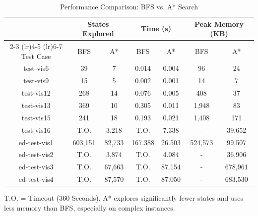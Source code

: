 \begin{table}[H]
\centering
\footnotesize
\setlength{\tabcolsep}{14pt}
\begin{threeparttable}
\caption{Performance Comparison: BFS vs. A* Search}
\label{tab:bench}
\begin{tabular}{c c c c c c c}
\toprule
 & \multicolumn{2}{c}{States Explored} & \multicolumn{2}{c}{Time (s)} & \multicolumn{2}{c}{Peak Memory (KB)} \\
\cmidrule(lr){2-3} \cmidrule(lr){4-5} \cmidrule(lr){6-7}
Test Case & BFS & A* & BFS & A* & BFS & A* \\
\midrule
test-vis6 & 39 & 7 & 0.014 & 0.004 & 96 & 24 \\
test-vis9 & 15 & 5 & 0.002 & 0.001 & 14 & 7 \\
test-vis12 & 268 & 14 & 0.076 & 0.005 & 408 & 37 \\
test-vis13 & 369 & 10 & 0.305 & 0.011 & 1,948 & 83 \\
test-vis15 & 241 & 18 & 0.193 & 0.021 & 1,408 & 171 \\
test-vis16 & T.O. & 3,218 & T.O. & 7.338 & - & 39,652 \\
ed-test-vis1 & 603,151 & 82,733 & 167.388 & 26.503 & 524,573 & 99,507 \\
ed-test-vis2 & T.O. & 3,874 & T.O. & 4.084 & - & 36,906 \\
ed-test-vis3 & T.O. & 67,663 & T.O. & 87.154 & - & 678,961 \\
ed-test-vis4 & T.O. & 87,570 & T.O. & 87.050 & - & 683,530 \\
\bottomrule
\end{tabular}
\begin{tablenotes}
\scriptsize
\item T.O. = Timeout (360 Seconds). A* explores significantly fewer states and uses less memory than BFS, especially on complex instances.
\end{tablenotes}
\end{threeparttable}
\end{table}